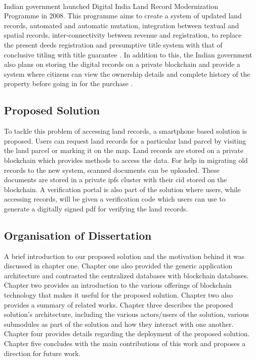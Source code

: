 \documentclass[12pt]{article}
\begin{document}
        \paragraph{}
        Indian government launched Digital India Land Record Modernization Programme in 2008. This programme aims to create a system of updated land records, automated and automatic mutation, integration between textual and spatial records, inter-connectivity between revenue and registration, to replace the present deeds registration and presumptive title system with that of conclusive titling with title guarantee \cite{dilrmp}. In addition to this, the Indian government also plans on storing the digital records on a private blockchain and provide a system where citizens can view the ownership details and complete history of the property before going in for the purchase \cite{blockchaingovin}.  

    \subsection{Proposed Solution}
        To tackle this problem of accessing land records, a smartphone based solution is proposed. Users can request land records for a particular land parcel by visiting the land parcel or marking it on the map. Land records are stored on a private blockchain which provides methods to access the data. For help in migrating old records to the new system, scanned documents can be uploaded. These documents are stored in a private \acrshort{ipfs} cluster with their \acrshort{cid} stored on the blockchain. A verification portal is also part of the solution where users, while accessing records, will be given a verification code which users can use to generate a digitally signed \acrshort{pdf} for verifying the land records. 
        
    \subsection{Organisation of Dissertation}
        A brief introduction to our proposed solution and the motivation behind it was discussed in chapter one. Chapter one also provided the generic application architecture and contrasted the centralized databases with blockchain databases. Chapter two provides an introduction to the various offerings of blockchain technology that makes it useful for the proposed solution. Chapter two also provides a summary of related works. Chapter three describes the proposed solution's architecture, including the various actors/users of the solution, various submodules as part of the solution and how they interact with one another. Chapter four provides details regarding the deployment of the proposed solution. Chapter five concludes with the main contributions of this work and proposes a direction for future work.
        
\end{document}
